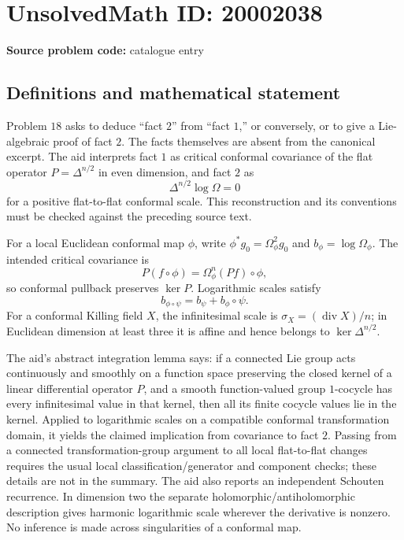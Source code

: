 \documentclass[11pt]{article}
\begin{document}
\section*{UnsolvedMath ID: 20002038}
\textbf{Source problem code:} catalogue entry
\subsection{Definitions and mathematical statement}
Problem \(18\) asks to deduce ``fact \(2\)'' from ``fact \(1\),'' or conversely, or to give a Lie-algebraic proof of fact \(2\). The facts themselves are absent from the canonical excerpt. The aid interprets fact \(1\) as critical conformal covariance of the flat operator \(P=\Delta^{n/2}\) in even dimension, and fact \(2\) as
\[
 \Delta^{n/2}\log\Omega=0
\]
for a positive flat-to-flat conformal scale. This reconstruction and its conventions must be checked against the preceding source text.

For a local Euclidean conformal map \(\phi\), write \(\phi^*g_0=\Omega_\phi^2g_0\) and \(b_\phi=\log\Omega_\phi\). The intended critical covariance is
\[
 P(f\circ\phi)=\Omega_\phi^n(Pf)\circ\phi,
\]
so conformal pullback preserves \(\ker P\). Logarithmic scales satisfy
\[
 b_{\phi\circ\psi}=b_\psi+b_\phi\circ\psi.
\]
For a conformal Killing field \(X\), the infinitesimal scale is \(\sigma_X=(\operatorname{div}X)/n\); in Euclidean dimension at least three it is affine and hence belongs to \(\ker\Delta^{n/2}\).

The aid's abstract integration lemma says: if a connected Lie group acts continuously and smoothly on a function space preserving the closed kernel of a linear differential operator \(P\), and a smooth function-valued group \(1\)-cocycle has every infinitesimal value in that kernel, then all its finite cocycle values lie in the kernel. Applied to logarithmic scales on a compatible conformal transformation domain, it yields the claimed implication from covariance to fact \(2\). Passing from a connected transformation-group argument to all local flat-to-flat changes requires the usual local classification/generator and component checks; these details are not in the summary. The aid also reports an independent Schouten recurrence. In dimension two the separate holomorphic/antiholomorphic description gives harmonic logarithmic scale wherever the derivative is nonzero. No inference is made across singularities of a conformal map.
\end{document}
